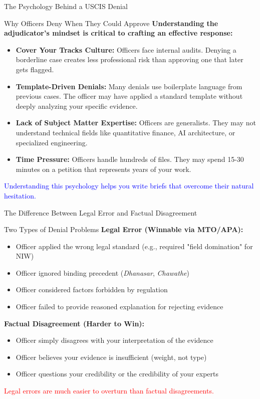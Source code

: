 \documentclass[11pt]{beamer}
\begin{document}
	\begin{frame}{The Psychology Behind a USCIS Denial}
		\scriptsize
		\begin{block}{Why Officers Deny When They Could Approve}
			\textbf{Understanding the adjudicator's mindset is critical to crafting an effective response:}
			\vspace{0.1cm}
			\begin{itemize}
				\item \textbf{Cover Your Tracks Culture:} Officers face internal audits. Denying a borderline case creates less professional risk than approving one that later gets flagged.
				\item \textbf{Template-Driven Denials:} Many denials use boilerplate language from previous cases. The officer may have applied a standard template without deeply analyzing your specific evidence.
				\item \textbf{Lack of Subject Matter Expertise:} Officers are generalists. They may not understand technical fields like quantitative finance, AI architecture, or specialized engineering.
				\item \textbf{Time Pressure:} Officers handle hundreds of files. They may spend 15-30 minutes on a petition that represents years of your work.
			\end{itemize}
			\textcolor{blue}{Understanding this psychology helps you write briefs that overcome their natural hesitation.}
		\end{block}
	\end{frame}
	
	\begin{frame}{The Difference Between Legal Error and Factual Disagreement}
		\scriptsize
		\begin{block}{Two Types of Denial Problems}
			\textbf{Legal Error (Winnable via MTO/APA):}
			\begin{itemize}
				\item Officer applied the wrong legal standard (e.g., required "field domination" for NIW)
				\item Officer ignored binding precedent (\textit{Dhanasar}, \textit{Chawathe})
				\item Officer considered factors forbidden by regulation
				\item Officer failed to provide reasoned explanation for rejecting evidence
			\end{itemize}
			\textbf{Factual Disagreement (Harder to Win):}
			\begin{itemize}
				\item Officer simply disagrees with your interpretation of the evidence
				\item Officer believes your evidence is insufficient (weight, not type)
				\item Officer questions your credibility or the credibility of your experts
			\end{itemize}
			\textcolor{red}{Legal errors are much easier to overturn than factual disagreements.}
		\end{block}
	\end{frame}
	
\end{document}
